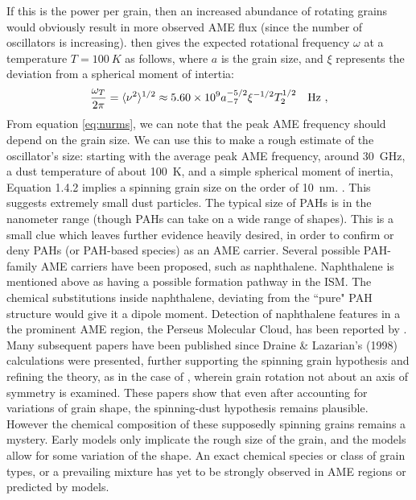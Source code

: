      If this is the power per grain, then an increased abundance of rotating grains would obviously result in more observed AME flux (since the number of oscillators is increasing).
     \cite{draine98a} then gives the expected rotational frequency $\omega$ at a temperature $T=100~K$ as follows, where $a$ is the grain size, and $\xi$ represents the deviation from a spherical moment of intertia:
\begin{equation}
{\omega_T\over 2\pi} = 
\langle\nu^2\rangle^{1/2}
\approx 5.60\times 10^9 a_{-7}^{-5/2}\xi^{-1/2}T_2^{1/2}~~~{\rm Hz}~,
\label{eq:nurms}
\end{equation}
     From equation \ref{eq:nurms}, we can note that the peak AME frequency should depend on the grain size. We can use this to make a rough estimate of the oscillator's size: starting with the average peak AME frequency, around 30~GHz, a dust temperature of about 100~K, and a simple spherical moment of inertia, Equation 1.4.2 implies a spinning grain size on the order of 10~nm. \citep{draine98b}. This suggests extremely small dust particles. The typical size of PAHs is in the nanometer range (though PAHs can take on a wide range of shapes). This is a small clue which leaves further evidence heavily desired, in order to confirm or deny PAHs (or PAH-based species) as an AME carrier. Several possible PAH-family AME carriers have been proposed, such as naphthalene. Naphthalene is mentioned above as having a possible formation pathway in the ISM. The chemical substitutions inside naphthalene, deviating from the ``pure" PAH structure would give it a dipole moment. Detection of naphthalene features in a the prominent AME region, the Perseus Molecular Cloud, has been reported by \cite{iglesiasgroth08}.
     Many subsequent papers have been published since Draine \& Lazarian's (1998) calculations were presented, further supporting the spinning grain hypothesis and refining the theory, as in the case of \cite{hoang10}, wherein grain rotation not about an axis of symmetry is examined. These papers show that even after accounting for variations of grain shape, the spinning-dust hypothesis remains plausible. However the chemical composition of these supposedly spinning grains remains a mystery.
     Early models only implicate the rough size of the grain, and the models allow for some variation of the shape. An exact chemical species or class of grain types, or a prevailing mixture has yet to be strongly observed in AME regions or predicted by models.

